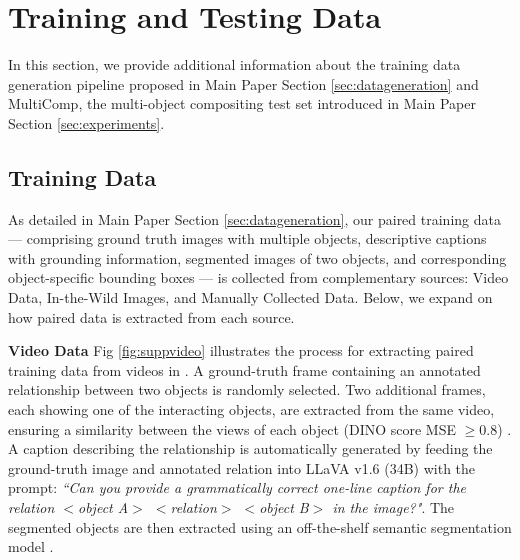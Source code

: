 \clearpage
\maketitlesupplementary
\setcounter{page}{1}
\setcounter{figure}{0}
\setcounter{section}{0}


\section{Training and Testing Data}

In this section, we provide additional information about the training data generation pipeline proposed in Main Paper Section \ref{sec:datageneration} and MultiComp, the multi-object compositing test set introduced in Main Paper Section \ref{sec:experiments}.

\subsection{Training Data}

As detailed in Main Paper Section \ref{sec:datageneration}, our paired training data --- comprising ground truth images with multiple objects, descriptive captions with grounding information, segmented images of two objects, and corresponding object-specific bounding boxes --- is collected from complementary sources: Video Data, In-the-Wild Images, and Manually Collected Data. Below, we expand on how paired data is extracted from each source.


\noindent\textbf{Video Data} Fig \ref{fig:suppvideo} illustrates the process for extracting paired training data from videos in \cite{shang2017video, shang2019annotating}. A ground-truth frame containing an annotated relationship between two objects is randomly selected. Two additional frames, each showing one of the interacting objects, are extracted from the same video, ensuring a similarity between the views of each object (DINO score MSE $\geq 0.8$) \cite{oquab2023dinov2}. A caption describing the relationship is automatically generated by feeding the ground-truth image and annotated relation into LLaVA v1.6 (34B) \cite{liu2023improvedllava} with the prompt:
\textit{``Can you provide a grammatically correct one-line caption for the relation $<$object A$>$ $<$relation$>$ $<$object B$>$ in the image?"}.
The segmented objects are then extracted using an off-the-shelf semantic segmentation model \cite{qi2022entityseg}.


